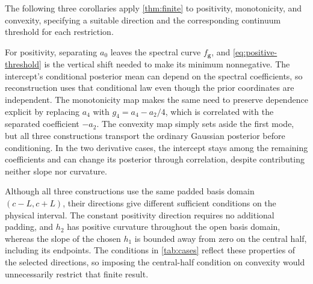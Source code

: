 The following three corollaries apply \cref{thm:finite} to positivity,
monotonicity, and convexity, specifying a suitable direction and the
corresponding continuum threshold for each restriction.



For positivity, separating $a_0$ leaves the spectral curve
$f_{\boldsymbol g}$, and \cref{eq:positive-threshold} is the vertical
shift needed to make its minimum nonnegative. The intercept's
conditional posterior mean can depend on the spectral coefficients,
so reconstruction uses that conditional law even though the prior
coordinates are independent. The monotonicity map makes the same
need to preserve dependence explicit by replacing $a_4$ with
$g_4=a_4-a_2/4$, which is correlated with the separated coefficient
$-a_2$. The convexity map simply sets aside the first mode, but all
three constructions transport the ordinary Gaussian posterior before
conditioning. In the two derivative cases, the intercept stays among
the remaining coefficients and can change its posterior through
correlation, despite contributing neither slope nor curvature.

Although all three constructions use the same padded basis domain
$(c-L,c+L)$, their directions give different sufficient conditions on
the physical interval. The constant positivity direction requires no
additional padding, and $h_2$ has positive curvature throughout the
open basis domain, whereas the slope of the chosen $h_1$ is bounded
away from zero on the central half, including its endpoints. The
conditions in \cref{tab:cases} reflect these properties of the selected
directions, so imposing the central-half condition on convexity would
unnecessarily restrict that finite result.

